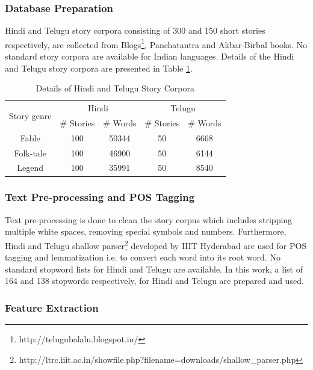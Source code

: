 \documentclass[times, 11pt, a4paper]{article}
\begin{document}
\subsubsection{Database Preparation} \label{Database Preparation}

Hindi and Telugu story corpora consisting of 300 and 150 short stories respectively, are collected from Blogs\footnote{http://telugubalalu.blogspot.in/}, Panchatantra and Akbar-Birbal books. No standard story corpora are available for Indian languages. Details of the Hindi and Telugu story corpora are presented in Table \ref{corpus}. 

\begin{table}[h]
\renewcommand{\arraystretch}{1}
\footnotesize\setlength{\tabcolsep}{8pt}
\caption{Details of Hindi and Telugu Story Corpora\label{corpus}}
\centering
\begin{tabular}{|c|c|c|c|c|}
\hline
\multirow{2}{*}{Story genre} & \multicolumn{2}{c|}{Hindi} & \multicolumn{2}{c|}{Telugu} \\ \cline{2-5} 
 & \# Stories & \# Words & \# Stories & \# Words \\ \hline
Fable & 100 & 50344 & 50 & 6668  \\ \hline
Folk-tale & 100 & 46900 & 50 & 6144  \\ \hline
Legend & 100 & 35991 & 50 & 8540  \\ \hline
\end{tabular}
\end{table}

\subsubsection{Text Pre-processing and POS Tagging} \label{Text Processing and POS Tagging}

Text pre-processing is done to clean the story corpus which includes stripping multiple white spaces, removing special symbols and numbers. Furthermore, Hindi and Telugu shallow parser\footnote{http://ltrc.iiit.ac.in/showfile.php?filename=downloads/shallow\_parser.php} developed by IIIT Hyderabad are used for POS tagging and lemmatization i.e. to convert each word into its root word. No standard stopword lists for Hindi and Telugu are available. In this work, a list of 164 and 138 stopwords respectively, for Hindi and Telugu are prepared and used.

\subsubsection{Feature Extraction} \label{Feature Extraction}
\end{document}
